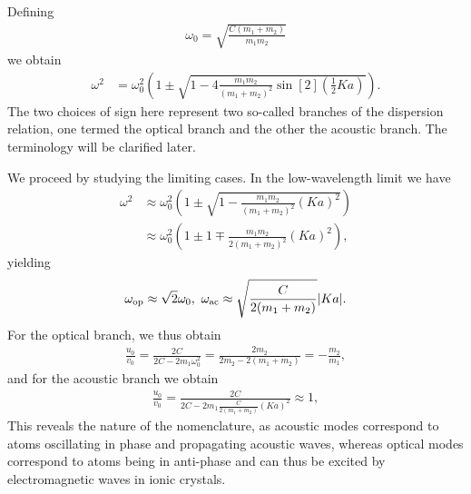 Defining
\begin{align*}
	\omega_{0} = \sqrt{\frac{C(m_{1} + m_{2})}{m_{1}m_{2}}}
\end{align*}
we obtain
\begin{align*}
	\omega^{2} &= \omega_{0}^{2}\left(1 \pm \sqrt{1 - 4\frac{m_{1}m_{2}}{(m_{1} + m_{2})^{2}}\sin[2](\frac{1}{2}Ka)}\right).
\end{align*}
The two choices of sign here represent two so-called branches of the dispersion relation, one termed the optical branch and the other the acoustic branch. The terminology will be clarified later.

We proceed by studying the limiting cases. In the low-wavelength limit we have
\begin{align*}
	\omega^{2} &\approx \omega_{0}^{2}\left(1 \pm \sqrt{1 - \frac{m_{1}m_{2}}{(m_{1} + m_{2})^{2}}(Ka)^{2}}\right) \\
	           &\approx \omega_{0}^{2}\left(1 \pm 1 \mp \frac{m_{1}m_{2}}{2(m_{1} + m_{2})^{2}}(Ka)^{2}\right),
\end{align*}
yielding
\begin{align*}
	\omega_{\text{op}} \approx \sqrt{2}\omega_{0},\ \omega_{\text{ac}} \approx \sqrt{\frac{C}{2(m_{1} + m_{2})}}\abs{Ka}.
\end{align*}
For the optical branch, we thus obtain
\begin{align*}
	\frac{u_{0}}{v_{0}} = \frac{2C}{2C - 2m_{1}\omega_{0}^{2}} = \frac{2m_{2}}{2m_{2} - 2(m_{1} + m_{2})} = -\frac{m_{2}}{m_{1}},
\end{align*}
and for the acoustic branch we obtain
\begin{align*}
	\frac{u_{0}}{v_{0}} = \frac{2C}{2C - 2m_{1}\frac{C}{2(m_{1} + m_{2})}(Ka)^{2}} \approx 1,
\end{align*}
This reveals the nature of the nomenclature, as acoustic modes correspond to atoms oscillating in phase and propagating acoustic waves, whereas optical modes correspond to atoms being in anti-phase and can thus be excited by electromagnetic waves in ionic crystals.

